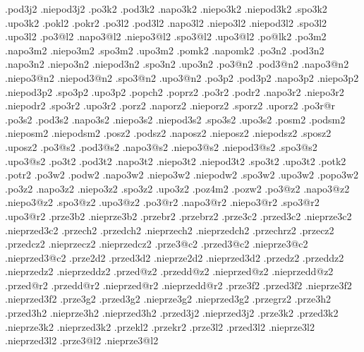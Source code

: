 {           .pod3j2                          .niepod3j2
  .po3k2   .pod3k2   .napo3k2   .niepo3k2   .niepod3k2   .spo3k2  .upo3k2  
  .pokl2
  .pokr2            
  .po3l2   .pod3l2   .napo3l2   .niepo3l2   .niepod3l2   .spo3l2  .upo3l2  
  .po3@l2            .napo3@l2  .niepo3@l2               .spo3@l2 .upo3@l2 
  .po@lk2
  .po3m2             .napo3m2   .niepo3m2                .spo3m2  .upo3m2  
  .pomk2             .napomk2          
  .po3n2   .pod3n2   .napo3n2   .niepo3n2   .niepod3n2   .spo3n2  .upo3n2  
  .po3@n2  .pod3@n2  .napo3@n2  .niepo3@n2  .niepod3@n2  .spo3@n2 .upo3@n2 
  .po3p2   .pod3p2   .napo3p2   .niepo3p2   .niepod3p2   .spo3p2  .upo3p2  
  .popch2           
  .poprz2           
  .po3r2   .podr2    .napo3r2   .niepo3r2   .niepodr2    .spo3r2  .upo3r2  
  .porz2             .naporz2   .nieporz2                .sporz2  .uporz2  
  .po3r@r  
  .po3s2   .pod3s2   .napo3s2   .niepo3s2   .niepod3s2   .spo3s2  .upo3s2  
  .posm2   .podsm2              .nieposm2   .niepodsm2
  .posz2   .podsz2   .naposz2   .nieposz2   .niepodsz2   .sposz2  .uposz2  
  .po3@s2  .pod3@s2  .napo3@s2  .niepo3@s2  .niepod3@s2  .spo3@s2 .upo3@s2 
  .po3t2   .pod3t2   .napo3t2   .niepo3t2   .niepod3t2   .spo3t2  .upo3t2  
  .potk2   
  .potr2   
  .po3w2   .podw2    .napo3w2   .niepo3w2   .niepodw2    .spo3w2  .upo3w2 
  .popo3w2  
  .po3z2             .napo3z2   .niepo3z2                .spo3z2  .upo3z2  
  .poz4m2              
  .pozw2
  .po3@z2            .napo3@z2  .niepo3@z2               .spo3@z2 .upo3@z2 
  .po3@r2            .napo3@r2  .niepo3@r2               .spo3@r2 .upo3@r2 
%
%
  .prze3b2                .nieprze3b2     
  .przebr2  
  .przebrz2 
  .prze3c2    .przed3c2   .nieprze3c2     .nieprzed3c2
  .przech2    .przedch2   .nieprzech2     .nieprzedch2
  .przechrz2                 
  .przecz2    .przedcz2   .nieprzecz2     .nieprzedcz2
  .prze3@c2   .przed3@c2  .nieprze3@c2    .nieprzed3@c2
  .prze2d2    .przed3d2   .nieprze2d2     .nieprzed3d2
  .przedz2    .przeddz2   .nieprzedz2     .nieprzeddz2
  .przed@z2   .przedd@z2  .nieprzed@z2    .nieprzedd@z2
  .przed@r2   .przedd@r2  .nieprzed@r2    .nieprzedd@r2
  .prze3f2    .przed3f2   .nieprze3f2     .nieprzed3f2
  .prze3g2    .przed3g2   .nieprze3g2     .nieprzed3g2
  .przegrz2 
  .prze3h2    .przed3h2   .nieprze3h2     .nieprzed3h2
              .przed3j2                   .nieprzed3j2
  .prze3k2    .przed3k2   .nieprze3k2     .nieprzed3k2
  .przekl2
  .przekr2  
  .prze3l2    .przed3l2   .nieprze3l2     .nieprzed3l2
  .prze3@l2               .nieprze3@l2    
}

